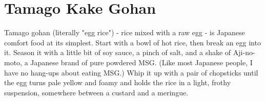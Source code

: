 \section{Tamago Kake Gohan}


  Tamago gohan (literally "egg rice") - rice mixed with a raw egg - is Japanese comfort food at its simplest. Start with a bowl of hot rice, then break an egg into it. Season it with a little bit of soy sauce, a pinch of salt, and a shake of Aji-no-moto, a Japanese brand of pure powdered MSG. (Like most Japanese people, I have no hang-ups about eating MSG.) Whip it up with a pair of chopsticks until the egg turns pale yellow and foamy and holds the rice in a light, frothy suspension, somewhere between a custard and a meringue.

